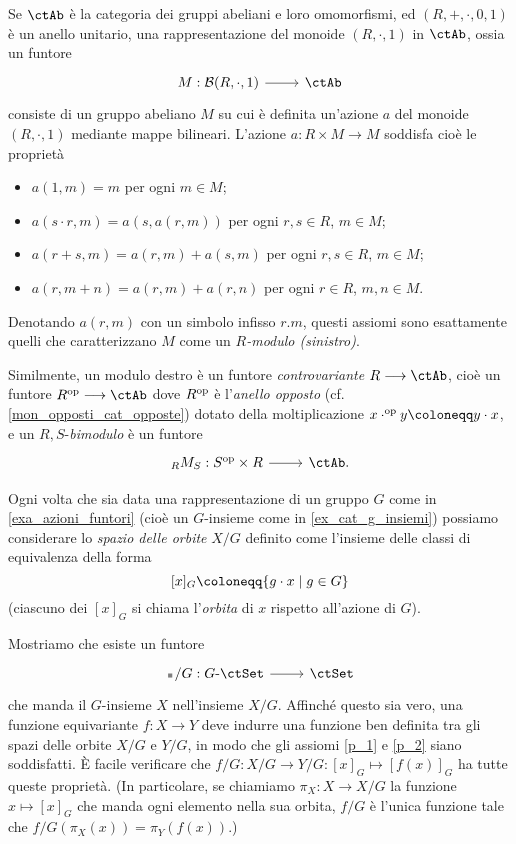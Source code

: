 \begin{example}
	Se \(\ctAb\) è la categoria dei gruppi abeliani e loro omomorfismi, ed \((R,+,\cdot,0,1)\) è un anello unitario, una rappresentazione del monoide \((R,\cdot,1)\) in \(\ctAb\), ossia un funtore
	\[\dmFun{M}{\susp(R,\cdot,1)}{\ctAb}\]
	consiste di un gruppo abeliano \(M\) su cui è definita un'azione \(a\) del monoide \((R,\cdot,1)\) mediante mappe bilineari. L'azione \(a : R\times M\to M\) soddisfa cioè le proprietà
	\begin{itemize}
		\item \(a(1,m)=m\) per ogni \(m\in M\);
		\item \(a(s\cdot r,m)=a(s,a(r,m))\) per ogni \(r,s\in R\), \(m\in M\);
		\item \(a(r+s,m) = a(r,m) + a(s,m)\) per ogni \(r,s\in R\), \(m\in M\);
		\item \(a(r,m+n) = a(r,m) + a(r,n)\) per ogni \(r\in R\), \(m,n\in M\).
	\end{itemize}
	Denotando \(a(r,m)\) con un simbolo infisso \(r.m\), questi assiomi sono esattamente quelli che caratterizzano \(M\) come un \emph{\(R\)-modulo (sinistro)}.

	Similmente, un modulo destro è un funtore \emph{controvariante} \(R\fun\ctAb\), cioè un funtore \(R^\op\fun\ctAb\) dove \(R^{\text{op}}\) è l'\emph{anello opposto} (cf. \ref{mon_opposti_cat_opposte}) dotato della moltiplicazione \(x\cdot^\op y \defeq y\cdot x\), e un \(R,S\)-\emph{bimodulo} è un funtore
	\[\dmFun{{}_RM_S}{S^\op\times R}{\ctAb.}\]
\end{example}
\begin{example}\label{ex_fun_orbite}
	Ogni volta che sia data una rappresentazione di un gruppo \(G\) come in \ref{exa_azioni_funtori} (cioè un \(G\)-insieme come in \ref{ex_cat_g_insiemi}) possiamo considerare lo \emph{spazio delle orbite} \(X/G\) definito come l'insieme delle classi di equivalenza della forma
	\[[x]_G \defeq \{g\cdot x\mid g\in G\}\]
	(ciascuno dei \([x]_G\) si chiama l'\emph{orbita} di \(x\) rispetto all'azione di \(G\)).

	Mostriamo che esiste un funtore
	\[\dmFun{\blank/G}{G\emdash\ctSet}{\ctSet}\]
	che manda il \(G\)-insieme \(X\) nell'insieme \(X/G\). Affinché questo sia vero, una funzione equivariante \(f : X\to Y\) deve indurre una funzione ben definita tra gli spazi delle orbite \(X/G\) e \(Y/G\), in modo che gli assiomi \ref{p_1} e \ref{p_2} siano soddisfatti. \`E facile verificare che \(f/G : X/G \to Y/G : [x]_G\mapsto [f(x)]_G\) ha tutte queste proprietà. (In particolare, se chiamiamo \(\pi_X : X\to X/G\) la funzione \(x\mapsto [x]_G\) che manda ogni elemento nella sua orbita, \(f/G\) è l'unica funzione tale che \(f/G(\pi_X(x)) = \pi_Y(f(x))\).)
\end{example}
